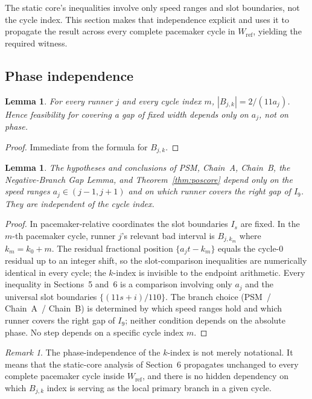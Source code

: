 \documentclass[12pt,a4paper]{amsart}
\newtheorem{lemma}[theorem]{Lemma}
\theoremstyle{definition}
\theoremstyle{remark}
\newtheorem{remark}[theorem]{Remark}
\newcommand{\Wref}{W_{\mathrm{ref}}}
\begin{document}
The static core's inequalities involve only speed ranges and slot boundaries, not the
cycle index. This section makes that independence explicit and uses it to propagate the
result across every complete pacemaker cycle in $\Wref$, yielding the required witness.

\subsection{Phase independence}

\begin{lemma}
For every runner $j$ and every cycle index $m$, $|B_{j,k}|=2/(11a_j)$.
Hence feasibility for covering a gap of fixed width depends only on $a_j$, not on phase.
\end{lemma}

\begin{proof}
Immediate from the formula for $B_{j,k}$.
\end{proof}

\begin{lemma}\label{lem:phaseindep2}
The hypotheses and conclusions of PSM, Chain~A, Chain~B, the Negative-Branch Gap Lemma,
and Theorem~\ref{thm:poscore} depend only on the speed ranges $a_j\in(j-1,j+1)$ and on
which runner covers the right gap of $I_9$. They are independent of the cycle index.
\end{lemma}

\begin{proof}
In pacemaker-relative coordinates the slot boundaries $I_s$ are fixed. In the $m$-th
pacemaker cycle, runner $j$'s relevant bad interval is $B_{j,k_m}$ where $k_m=k_0+m$.
The residual fractional position $\{a_jt - k_m\}$ equals the cycle-0 residual up to an
integer shift, so the slot-comparison inequalities are numerically identical in every cycle;
the $k$-index is invisible to the endpoint arithmetic. Every inequality in Sections~5
and~6 is a comparison involving only $a_j$ and the universal slot boundaries
$\{(11s+i)/110\}$. The branch choice (PSM~/ Chain~A~/ Chain~B) is determined by which
speed ranges hold and which runner covers the right gap of $I_9$; neither condition depends
on the absolute phase. No step depends on a specific cycle index $m$.
\end{proof}

\begin{remark}
The phase-independence of the $k$-index is not merely notational. It means that the
static-core analysis of Section~6 propagates unchanged to every complete pacemaker cycle
inside $\Wref$, and there is no hidden dependency on which $B_{j,k}$ index is serving as
the local primary branch in a given cycle.
\end{remark}
\end{document}
